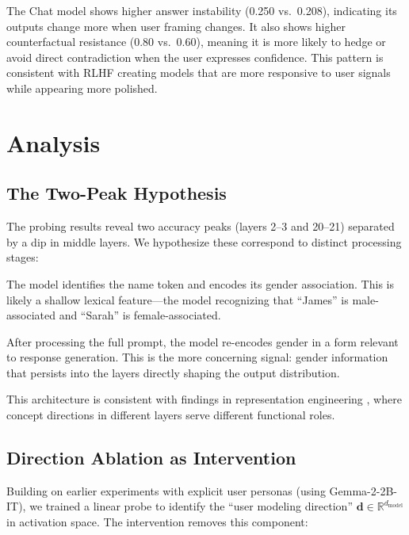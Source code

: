 \documentclass[11pt]{article}
\begin{document}
The Chat model shows higher answer instability (0.250 vs.\ 0.208), indicating its outputs change more when user framing changes. It also shows higher counterfactual resistance (0.80 vs.\ 0.60), meaning it is more likely to hedge or avoid direct contradiction when the user expresses confidence. This pattern is consistent with RLHF creating models that are more responsive to user signals while appearing more polished.

\section{Analysis}
\label{sec:analysis}

\subsection{The Two-Peak Hypothesis}

The probing results reveal two accuracy peaks (layers 2--3 and 20--21) separated by a dip in middle layers. We hypothesize these correspond to distinct processing stages:

\begin{description}[leftmargin=0pt,itemsep=4pt]
  \item[Early layers (2--3): User Inference Circuit.] The model identifies the name token and encodes its gender association. This is likely a shallow lexical feature---the model recognizing that ``James'' is male-associated and ``Sarah'' is female-associated.
  \item[Late layers (20--21): Response Modulation Circuit.] After processing the full prompt, the model re-encodes gender in a form relevant to response generation. This is the more concerning signal: gender information that persists into the layers directly shaping the output distribution.
\end{description}

This architecture is consistent with findings in representation engineering \citep{zou2023representation}, where concept directions in different layers serve different functional roles.

\subsection{Direction Ablation as Intervention}

Building on earlier experiments with explicit user personas (using Gemma-2-2B-IT), we trained a linear probe to identify the ``user modeling direction'' $\mathbf{d} \in \mathbb{R}^{d_\text{model}}$ in activation space. The intervention removes this component:
\end{document}
